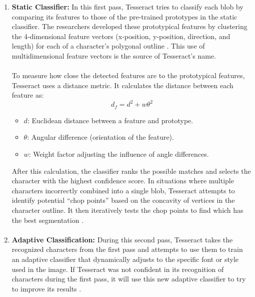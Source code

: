 \documentclass[10pt,twocolumn]{article}
\begin{document}
\begin{enumerate}
    \item \textbf{Static Classifier:} In this first pass, Tesseract tries to classify each blob by comparing its features to those of the pre-trained prototypes in the static classifier. The researchers developed these prototypical features by clustering the 4-dimensional feature vectors (x-position, y-position, direction, and length) for each of a character’s polygonal outline \cite{Overview_Akhil}. This use of multidimensional feature vectors is the source of Tesseract’s name.
    \paragraph{}To measure how close the detected features are to the prototypical features, Tesseract uses a distance metric. It calculates the distance between each feature as:
    \[
d_f = d^2 + w\theta^2
\]

\begin{itemize}
    \item $d$: Euclidean distance between a feature and prototype.
    \item $\theta$: Angular difference (orientation of the feature).
    \item $w$: Weight factor adjusting the influence of angle differences.
\end{itemize}
After this calculation, the classifier ranks the possible matches and selects the character with the highest confidence score. In situations where multiple characters incorrectly combined into a single blob, Tesseract attempts to identify potential “chop points” based on the concavity of vertices in the character outline. It then iteratively tests the chop points to find which has the best segmentation \cite{Overview_Smith}\cite{Overview_Akhil}.
\paragraph{}

    \item \textbf{Adaptive Classification:} During this second pass, Tesseract takes the recognized characters from the first pass and attempts to use them to train an adaptive classifier that dynamically adjusts to the specific font or style used in the image. If Tesseract was not confident in its recognition of characters during the first pass, it will use this new adaptive classifier to try to improve its results \cite{Overview_Smith}\cite{Overview_Akhil}.
\end{enumerate}
\end{document}
